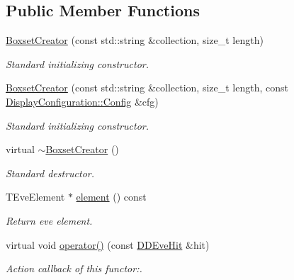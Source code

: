 \subsection*{Public Member Functions}
\begin{DoxyCompactItemize}
\item 
\hyperlink{struct_d_d4hep_1_1_boxset_creator_ae1b4d9e1ebffeed4bce0e2be8ab60396}{BoxsetCreator} (const std::string \&collection, size\_\-t length)
\begin{DoxyCompactList}\small\item\em Standard initializing constructor. \item\end{DoxyCompactList}\item 
\hyperlink{struct_d_d4hep_1_1_boxset_creator_a8fd3750929d22eb789720db97194c48e}{BoxsetCreator} (const std::string \&collection, size\_\-t length, const \hyperlink{class_d_d4hep_1_1_display_configuration_1_1_config}{DisplayConfiguration::Config} \&cfg)
\begin{DoxyCompactList}\small\item\em Standard initializing constructor. \item\end{DoxyCompactList}\item 
virtual \hyperlink{struct_d_d4hep_1_1_boxset_creator_a244124a28255dd2e0533a64ce7ee1b56}{$\sim$BoxsetCreator} ()
\begin{DoxyCompactList}\small\item\em Standard destructor. \item\end{DoxyCompactList}\item 
TEveElement $\ast$ \hyperlink{struct_d_d4hep_1_1_boxset_creator_afce37024e266b221fcc84fc92dbff3e7}{element} () const 
\begin{DoxyCompactList}\small\item\em Return eve element. \item\end{DoxyCompactList}\item 
virtual void \hyperlink{struct_d_d4hep_1_1_boxset_creator_a25f63197d03ad33193ac3c77207db808}{operator()} (const \hyperlink{class_d_d4hep_1_1_d_d_eve_hit}{DDEveHit} \&hit)
\begin{DoxyCompactList}\small\item\em Action callback of this functor:. \item\end{DoxyCompactList}\end{DoxyCompactItemize}
